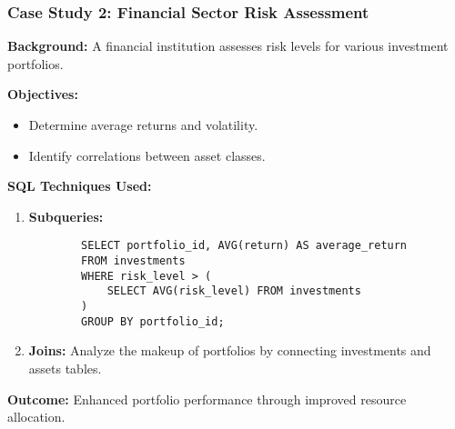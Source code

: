 \documentclass[aspectratio=169]{beamer}
\begin{document}
\begin{frame}[fragile]
    \frametitle{Case Study 2: Financial Sector Risk Assessment}
    
    \textbf{Background:} A financial institution assesses risk levels for various investment portfolios.
    
    \textbf{Objectives:}
    \begin{itemize}
        \item Determine average returns and volatility.
        \item Identify correlations between asset classes.
    \end{itemize}
    
    \textbf{SQL Techniques Used:}
    \begin{enumerate}
        \item \textbf{Subqueries:}
        \begin{lstlisting}
        SELECT portfolio_id, AVG(return) AS average_return
        FROM investments
        WHERE risk_level > (
            SELECT AVG(risk_level) FROM investments
        )
        GROUP BY portfolio_id;
        \end{lstlisting}
        
        \item \textbf{Joins:} 
        Analyze the makeup of portfolios by connecting investments and assets tables.
    \end{enumerate}
    
    \textbf{Outcome:} Enhanced portfolio performance through improved resource allocation.
\end{frame}
\end{document}
